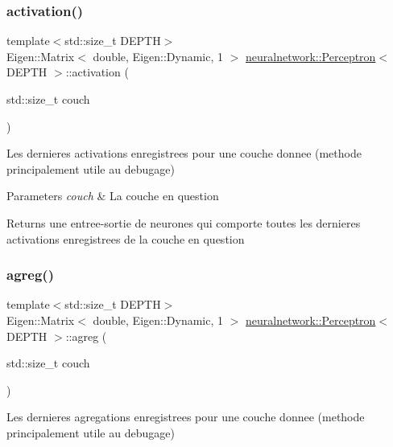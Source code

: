 \subsubsection{\texorpdfstring{activation()}{activation()}}
{\footnotesize\ttfamily template$<$std\+::size\+\_\+t D\+E\+P\+TH$>$ \\
Eigen\+::\+Matrix$<$ double, Eigen\+::\+Dynamic, 1 $>$ \mbox{\hyperlink{classneuralnetwork_1_1_perceptron}{neuralnetwork\+::\+Perceptron}}$<$ D\+E\+P\+TH $>$\+::activation (\begin{DoxyParamCaption}\item[{std\+::size\+\_\+t}]{couch }\end{DoxyParamCaption})}



Les dernieres activations enregistrees pour une couche donnee (methode principalement utile au debugage) 


\begin{DoxyParams}{Parameters}
{\em couch} & La couche en question \\
\hline
\end{DoxyParams}
\begin{DoxyReturn}{Returns}
une entree-\/sortie de neurones qui comporte toutes les dernieres activations enregistrees de la couche en question 
\end{DoxyReturn}
\mbox{\label{classneuralnetwork_1_1_perceptron_a41fec540bd2a224e43ab156623fce304}} 
\subsubsection{\texorpdfstring{agreg()}{agreg()}}
{\footnotesize\ttfamily template$<$std\+::size\+\_\+t D\+E\+P\+TH$>$ \\
Eigen\+::\+Matrix$<$ double, Eigen\+::\+Dynamic, 1 $>$ \mbox{\hyperlink{classneuralnetwork_1_1_perceptron}{neuralnetwork\+::\+Perceptron}}$<$ D\+E\+P\+TH $>$\+::agreg (\begin{DoxyParamCaption}\item[{std\+::size\+\_\+t}]{couch }\end{DoxyParamCaption})}



Les dernieres agregations enregistrees pour une couche donnee (methode principalement utile au debugage) 


